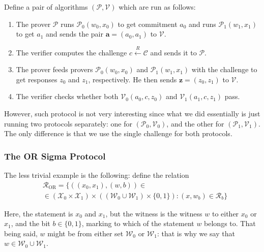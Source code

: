 \documentclass[../lecture-notes-105x135.tex]{subfiles}
\begin{document}
\begin{definition}
    Define a pair of algorithms $(\mathcal{P},\mathcal{V})$ which are run as follows:
    \begin{enumerate}
        \item The prover $\mathcal{P}$ runs $\mathcal{P}_0(w_0,x_0)$ to get commitment $a_0$ and runs $\mathcal{P}_1(w_1,x_1)$ to get $a_1$ and sends the pair $\mathbf{a} = (a_0,a_1)$ to $\mathcal{V}$.
        \item The verifier computes the challenge $c \xleftarrow{R} \mathcal{C}$ and sends it to $\mathcal{P}$.
        \item The prover feeds provers $\mathcal{P}_0(w_0,x_0)$ and $\mathcal{P}_1(w_1,x_1)$ with the challenge to get responses $z_0$ and $z_1$, respectively. He then sends $\mathbf{z} = (z_0,z_1)$ to $\mathcal{V}$.
        \item The verifier checks whether both $\mathcal{V}_0(a_0,c,z_0)$ and $\mathcal{V}_1(a_1,c,z_1)$ pass.
    \end{enumerate}
\end{definition}

However, such protocol is not very interesting since what we did essentially is just running two protocols separately: one for $(\mathcal{P}_0,\mathcal{V}_0)$, and the other for $(\mathcal{P}_1,\mathcal{V}_1)$. The only difference is that we use the single challenge for both protocols.

\subsubsection{The OR Sigma Protocol}

The less trivial example is the following: define the relation
\begin{equation*}
    \begin{aligned}        
        &\mathcal{R}_{\text{OR}} = \{ ((x_0, x_1), (w, b)) \in \\
        & \in (\mathcal{X}_0 \times \mathcal{X}_1) \times ((\mathcal{W}_0 \cup \mathcal{W}_1) \times \{0,1\}): (x, w_b) \in \mathcal{R}_b \}
    \end{aligned}
\end{equation*}

Here, the statement is $x_0$ and $x_1$, but the witness is the witness $w$ to either $x_0$ or $x_1$, and the bit $b \in \{0,1\}$, marking to which of the statement $w$ belongs to. That being said, $w$ might be from either set $\mathcal{W}_0$ or $\mathcal{W}_1$: that is why we say that $w \in \mathcal{W}_0 \cup \mathcal{W}_1$.
\end{document}
